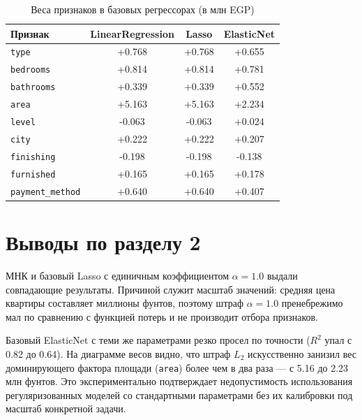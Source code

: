 \begin{table}[H]
\centering
\caption{Веса признаков в базовых регрессорах (в млн EGP)}
\begin{tabular}{|l|c|c|c|}
\hline
\textbf{Признак} & \textbf{LinearRegression} & \textbf{Lasso} & \textbf{ElasticNet} \\
\hline
\texttt{type} & +0.768 & +0.768 & +0.655 \\
\texttt{bedrooms} & +0.814 & +0.814 & +0.781 \\
\texttt{bathrooms} & +0.339 & +0.339 & +0.552 \\
\texttt{area} & +5.163 & +5.163 & +2.234 \\
\texttt{level} & -0.063 & -0.063 & +0.024 \\
\texttt{city} & +0.222 & +0.222 & +0.207 \\
\texttt{finishing} & -0.198 & -0.198 & -0.138 \\
\texttt{furnished} & +0.165 & +0.165 & +0.178 \\
\texttt{payment\_method} & +0.640 & +0.640 & +0.407 \\
\hline
\end{tabular}
\end{table}

\section{Выводы по разделу 2}

МНК и базовый Lasso с единичным коэффициентом $\alpha=1.0$ выдали совпадающие результаты. Причиной служит масштаб значений: средняя цена квартиры составляет миллионы фунтов, поэтому штраф $\alpha=1.0$ пренебрежимо мал по сравнению с функцией потерь и не производит отбора признаков.

Базовый ElasticNet с теми же параметрами резко просел по точности ($R^2$ упал с 0.82 до 0.64). На диаграмме весов видно, что штраф $L_2$ искусственно занизил вес доминирующего фактора площади (\texttt{area}) более чем в два раза — с 5.16 до 2.23 млн фунтов. Это экспериментально подтверждает недопустимость использования регуляризованных моделей со стандартными параметрами без их калибровки под масштаб конкретной задачи.
